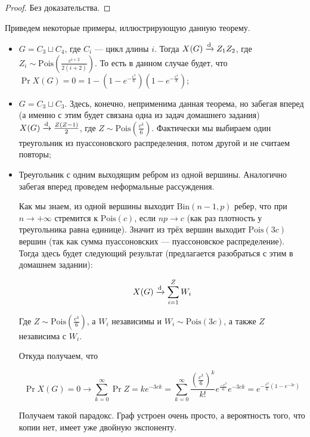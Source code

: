 \begin{proof}
  Без доказательства.
\end{proof}

\begin{example}
  Приведем некоторые примеры, иллюстрирующую данную теорему.

  \begin{itemize}
    \item $G = C_3 \sqcup C_4$, где $C_i$ --- цикл длины $i$.
    Тогда $X(G) \xrightarrow{\mathrm{d}} Z_1Z_2$, где $Z_i \sim
    \mathrm{Pois}\left(\frac{c^{i + 2}}{2(i + 2)}\right)$.
    То есть в данном случае будет, что $\Pr{X(G) = 0} = 
    1 - \left(1 - e^{-\frac{c^3}{6}}\right)\left(1 - e^{-\frac{c^4}{8}}\right)$;
    \item $G = C_3 \sqcup C_3$. Здесь, конечно, неприменима данная теорема,
    но забегая вперед (а именно с этим будет связана одна из задач домашнего
    задания) $X(G) \xrightarrow{\mathrm{d}} \frac{Z(Z - 1)}{2}$, где $Z \sim 
    \mathrm{Pois}\left(\frac{c^{3}}{6}\right)$. Фактически мы выбираем один треугольник
    из пуассоновского распределения, потом другой и не считаем повторы;
    \item Треугольник с одним выходящим ребром из одной вершины. Аналогично забегая
    вперед проведем неформальные рассуждения.

    Как мы знаем, из одной вершины выходит $\mathrm{Bin}(n - 1, p)$ ребер, что
    при $n \to +\infty$ стремится к $\mathrm{Pois}(c)$, если $np \to c$ (как
    раз плотность у треугольника равна единице). Значит из трёх вершин выходит
    $\mathrm{Pois}(3c)$ вершин (так как сумма пуассоновских --- пуассоновское
    распределение). Тогда здесь будет следующий результат (предлагается разобраться
    с этим в домашнем задании):

    \[
      X(G) \xrightarrow{\mathrm{d}} \sum\limits_{i = 1}^{Z} W_i
    \]

    Где $Z \sim \mathrm{Pois}\left(\frac{c^3}{6}\right)$, а $W_i$ независимы и
    $W_i \sim \mathrm{Pois}(3c)$, а также $Z$ независима с $W_i$.

    Откуда получаем, что

    \[
      \Pr{X(G) = 0} \to \sum\limits_{k = 0}^{\infty} \Pr{Z = k}e^{-3ck} = 
      \sum\limits_{k = 0}^{\infty} \frac{\left(\frac{c^{3}}{6}\right)^k}{k!}e^{\frac{-c^3}{6}}e^{-3ck} =
      e^{-\frac{c^3}{6}(1 - e^{-3c})}
    \]

    Получаем такой парадокс. Граф устроен очень просто, а вероятность того, что
    копии нет, имеет уже двойную экспоненту.
  \end{itemize}
\end{example}

